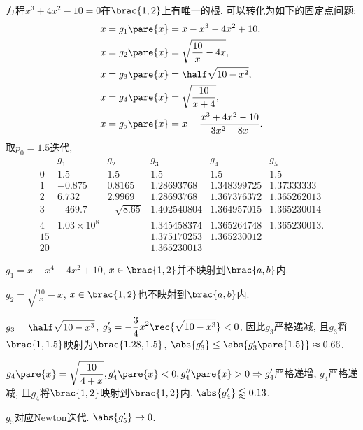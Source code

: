 \documentclass[hidelinks]{ctexart}
\begin{document}
\begin{ex}
    方程$x^3 + 4x^2 -10 = 0$在$\brac{1,2}$上有唯一的根. 可以转化为如下的固定点问题:
    \begin{align*}
        x&= g_1\pare{x} = x-x^3 -4x^2 + 10, \\
        x&= g_2\pare{x} = \sqrt{\frac{10}{x} - 4x}, \\
        x&= g_3\pare{x} = \half \sqrt{10-x^2}, \\
        x&= g_4\pare{x} = \sqrt{\frac{10}{x+4}}, \\
        x&= g_5\pare{x} = x - \frac{x^3 + 4x^2 - 10}{3x^2 + 8x}.
    \end{align*}
    取$p_0 = 1.5$迭代,
    \begin{equation*}
        \begin{array}{cccccc}
            & g_1 & g_2 & g_3 & g_4 & g_5 \\
            0 & 1.5 & 1.5 & 1.5 & 1.5 & 1.5 \\
            1 & -0.875 & 0.8165 & 1.28693768 & 1.348399725 & 1.37333333 \\
            2 & 6.732 & 2.9969 & 1.28693768 & 1.367376372 & 1.365262013 \\
            3 & -469.7 & -\sqrt{8.65} & 1.402540804 & 1.364957015 & 1.365230014 \\
            4 &  1.03 \times 10^8 & & 1.345458374 & 1.365264748 & 1.365230013. \\
            15 & & & 1.375170253 & 1.365230012 \\
            20 & & & 1.365230013
        \end{array}
    \end{equation*}
    \begin{cenum}
        \item $g_1 = x-x^4 - 4x^2 + 10$, $x\in \brac{1,2}$并不映射到$\brac{a,b}$内.
        \item $\displaystyle g_2 = \sqrt{\frac{10}{x} - x}$, $x\in \brac{1,2}$也不映射到$\brac{a,b}$内.
        \item $\displaystyle g_3 = \half \sqrt{10-x^3}$, $\displaystyle g'_3 = -\frac{3}{4}x^2\rec{\sqrt{10 - x^3}} < 0$, 因此$g_3$严格递减, 且$g_3$将$\brac{1,1.5}$映射为$\brac{1.28,1.5}$, $\abs{g_3'} \le \abs{g_3'\pare{1.5}}\approx 0.66$.
        \item $\displaystyle g_4\pare{x} = \sqrt{\frac{10}{4+x}}, g_4'\pare{x} < 0, g_4''\pare{x} > 0 \Rightarrow g'_4$严格递增, $g_4$严格递减, 且$g_4$将$\brac{1,2}$映射到$\brac{1,2}$内. $\abs{g'_4} \lessapprox 0.13$.
        \item $g_5$对应Newton迭代. $\abs{g_5'}\rightarrow 0$.
    \end{cenum}
\end{ex}
\end{document}
